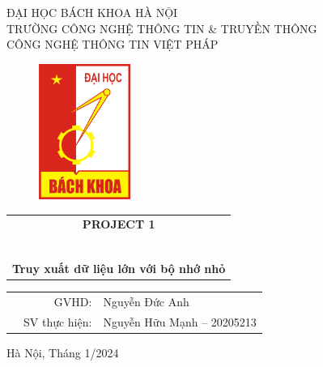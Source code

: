 \documentclass[a4paper]{article}
\theoremstyle{definition}
\begin{document}
\begin{titlepage}
\begin{center}
ĐẠI HỌC BÁCH KHOA HÀ NỘI \\
TRƯỜNG CÔNG NGHỆ THÔNG TIN \& TRUYỀN THÔNG \\
CÔNG NGHỆ THÔNG TIN VIỆT PHÁP
\end{center}

\vspace{1cm}

\begin{figure}[h!]
\begin{center}
\includegraphics[width=3cm]{Images/hust.png}
\end{center}
\end{figure}

\vspace{1cm}


\begin{center}
\begin{tabular}{c}
\multicolumn{1}{c}{\textbf{{\Large PROJECT 1}}}\\
~~\\
\hline
\\

\textbf{\large Truy xuất dữ liệu lớn với bộ nhớ nhỏ}
\\
\hline
\end{tabular}
\end{center}

\vspace{1.5cm}

\begin{table}[h]
\begin{tabular}{rrl}
\hspace{4 cm} & GVHD: & Nguyễn Đức Anh\\
& SV thực hiện: & Nguyễn Hữu Mạnh -- 20205213 \\
\end{tabular}
\end{table}
\vspace{2cm}
\begin{center}
{\footnotesize Hà Nội, Tháng 1/2024}
\end{center}
\end{titlepage}
\end{document}
